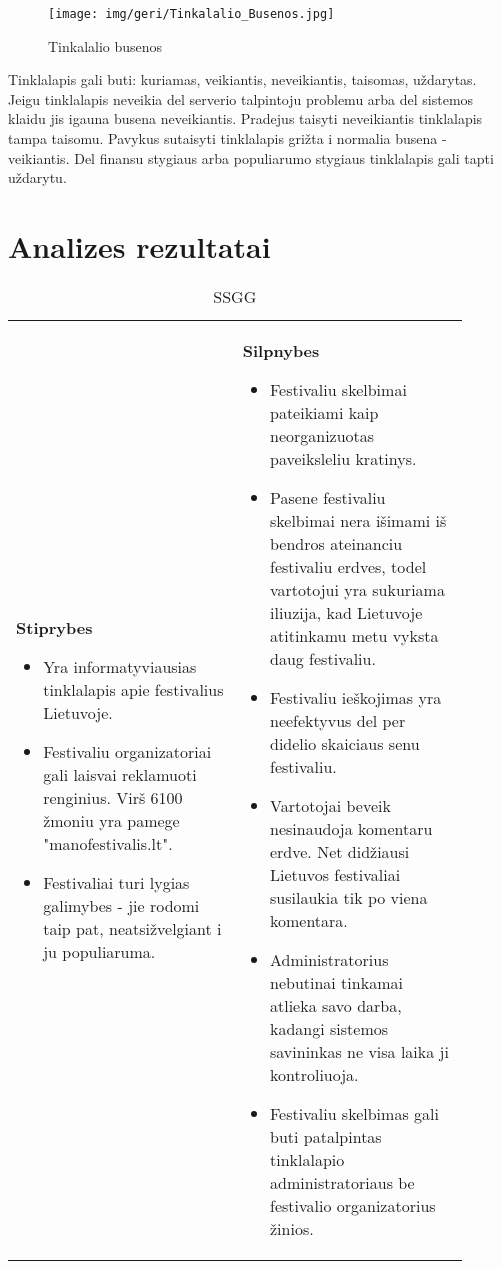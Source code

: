 ﻿\documentclass{VUMIFPSkursinis}
\begin{document}
{\begin{figure}[H]
    \centering
    \texttt{[image: img/geri/Tinkalalio\_Busenos.jpg]}
    \label{img:uml20}
	\caption{Tinkalalio busenos}
\end{figure}
Tinklalapis gali buti: kuriamas, veikiantis, neveikiantis, taisomas, uždarytas. Jeigu tinklalapis neveikia del serverio talpintoju problemu arba del sistemos klaidu jis igauna busena neveikiantis. Pradejus taisyti neveikiantis tinklalapis tampa taisomu. Pavykus sutaisyti tinklalapis grižta i normalia busena - veikiantis. Del finansu stygiaus arba populiarumo stygiaus tinklalapis gali tapti uždarytu.

\section{Analizes rezultatai}
\begin{longtable}{|p{0.45\linewidth}|p{0.45\linewidth}|} 
  \caption{SSGG}\\
  \hline
  \textbf{Stiprybes}
  \begin{itemize}
	\item Yra informatyviausias tinklalapis apie festivalius Lietuvoje.
	\item Festivaliu organizatoriai gali laisvai reklamuoti renginius. Virš 6100 žmoniu yra pamege "manofestivalis.lt".
	\item Festivaliai turi lygias galimybes - jie rodomi taip pat, neatsižvelgiant i ju populiaruma.
  \end{itemize}
  &
  \textbf{Silpnybes}
  \begin{itemize}
	\item Festivaliu skelbimai pateikiami kaip neorganizuotas paveiksleliu kratinys.
	\item Pasene festivaliu skelbimai nera išimami iš bendros ateinanciu festivaliu erdves, todel vartotojui yra sukuriama iliuzija, kad Lietuvoje atitinkamu metu vyksta daug festivaliu.
	\item Festivaliu ieškojimas yra neefektyvus del per didelio skaiciaus senu festivaliu.
	\item Vartotojai beveik nesinaudoja komentaru erdve. Net didžiausi Lietuvos festivaliai susilaukia tik po viena komentara.
	\item Administratorius nebutinai tinkamai atlieka savo darba, kadangi sistemos savininkas ne visa laika ji kontroliuoja.
	\item Festivaliu skelbimas gali buti patalpintas tinklalapio administratoriaus be festivalio organizatorius žinios.

\end{itemize}
\end{longtable}}
\end{document}

